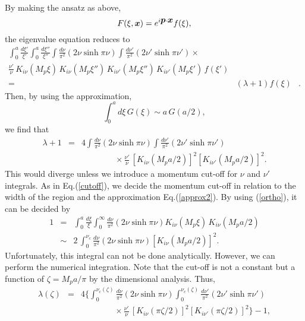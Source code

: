 By making the ansatz as above,
\begin{equation}
  F(\xi,\mbox{\boldmath $x$}) = e^{i\mbox{\boldmath $p$}\cdot\mbox{\boldmath $x$}} f(\xi),
\end{equation}
the eigenvalue equation reduces to
\begin{eqnarray}
 \int^a_0 \frac{d\xi'}{\xi'} \int^a_0 \frac{d\xi''}{\xi''}
  \int\frac{d\nu}{\pi^2}  (2\nu\sinh\pi\nu)
\int\frac{d\nu'}{\pi^2} (2\nu'\sinh\pi\nu')  \times 
 & &  \nonumber \\
\frac{\nu'}{\nu}\,
  K_{i\nu}(M_p\xi)\,K_{i\nu}(M_p\xi'')\,
   K_{i\nu'}(M_p\xi'')\,K_{i\nu'}(M_p\xi')\, f(\xi')
 & &   \nonumber \\
= &(\lambda+1)f(\xi)  & .
\end{eqnarray}
Then, by using the approximation,
\begin{equation}
  \int^a_0 d\xi\, G(\xi) \sim a\,G(a/2),
\label{approx2}
\end{equation}
we find that
\begin{eqnarray}
 \lambda+1 &=& 4\int\frac{d\nu}{\pi^2}(2\nu\sinh\pi\nu)
\int\frac{d\nu'}{\pi^2} (2\nu'\sinh\pi\nu') \nonumber \\
  &  & \qquad\qquad{}\times \frac{\nu'}{\nu}\,
\left[K_{i\nu}(M_pa/2)\right]^2
\left[K_{i\nu'}(M_pa/2)\right]^2 .
\end{eqnarray}
This would diverge unless we introduce a momentum cut-off for
$\nu$ and $\nu'$ integrals.
As in Eq.(\ref{cutoff}),
we decide the momentum cut-off in relation to
the width of the region
and the approximation Eq.(\ref{approx2}).
By using (\ref{ortho}), it can be decided by
\begin{eqnarray}
 1&=&\int^a_0 \frac{d\xi}{\xi} 
    \int^\infty_0 \frac{d\nu}{\pi^2}(2\nu\sinh\pi\nu) 
    K_{i\nu}(M_p\xi)\,K_{i\nu}(M_pa/2)\nonumber \\
  &\sim & 2\,\int^{\nu_c}_0 \frac{d\nu}{\pi^2}(2\nu\sinh\pi\nu) 
    \left[K_{i\nu}(M_pa/2)\right]^2.
\end{eqnarray}
Unfortunately, this integral can not be done analytically.
However, we can perform the numerical integration.
Note that the cut-off is not a constant but a function 
of $\zeta=M_pa/\pi$ by the dimensional analysis.
Thus,
\begin{eqnarray}
  \lambda(\zeta)&=&4\Biggl\{\int^{\nu_c(\zeta)}_0
     \frac{d\nu}{\pi^2}(2\nu\sinh\pi\nu)
   \int^{\nu_c(\zeta)}_0\frac{d\nu'}{\pi^2} (2\nu'\sinh\pi\nu') 
   \nonumber \\ 
  &  & 
  \qquad\qquad{}\times \frac{\nu'}{\nu}\,
 \left[K_{i\nu}(\pi\zeta/2)\right]^2
  \left[K_{i\nu'}(\pi\zeta/2)\right]^2\Biggr\}-1 ,
\end{eqnarray}
